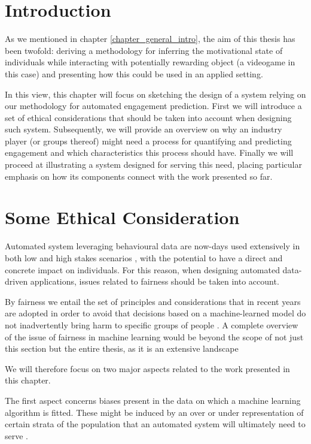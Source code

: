 \section{Introduction}
\label{industry_needs}
As we mentioned in chapter \ref{chapter_general_intro}, the aim of this thesis has been twofold: deriving a methodology for inferring the motivational state of individuals while interacting with potentially rewarding object (a videogame in this case) and presenting how this could be used in an applied setting.

In this view, this chapter will focus on sketching the design of a system relying on our methodology for automated engagement prediction. First we will introduce a set of ethical considerations that should be taken into account when designing such system. Subsequently, we will provide an overview on why an industry player (or groups thereof) might need a process for quantifying and predicting engagement and which characteristics this process should have. Finally we will proceed at illustrating a system designed for serving this need, placing particular emphasis on how its components connect with the work presented so far.

\section{Some Ethical Consideration}
\label{ehtical_considerations}
Automated system leveraging behavioural data are now-days used extensively in both low and high stakes scenarios \cite{mehrabi2021survey}, with the potential to have a direct and concrete impact on individuals. For this reason, when designing automated data-driven applications, issues related to fairness should be taken into account. 

By fairness we entail the set of principles and considerations that in recent years are adopted in order to avoid that decisions based on a machine-learned model do not inadvertently bring harm to specific groups of people \cite{mehrabi2021survey}. A complete overview of the issue of fairness in machine learning would be beyond the scope of not just this section but the entire thesis, as it is an extensive \cite{mehrabi2021survey} landscape 

We will therefore focus on two major aspects related to the work presented in this chapter. 

The first aspect concerns biases present in the data on which a machine learning algorithm is fitted. These might be induced by an over or under representation of certain strata of the population that an automated system will ultimately need to serve \cite{mehrabi2021survey}.  

